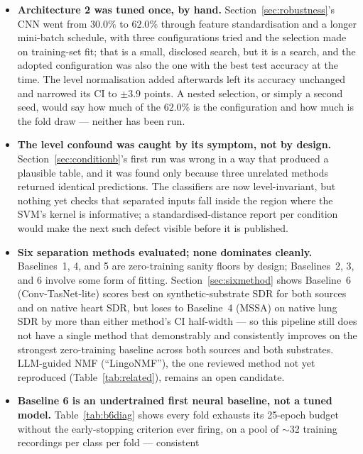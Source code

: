 \documentclass[11pt]{article}
\begin{document}
\begin{itemize}
    synthetic substrate's job (Section~\ref{sec:synthetic}); running the
    sweep and both classifiers over its 1500 rows is the direct next step.
  \item \textbf{Architecture 2 was tuned once, by hand.}
    Section~\ref{sec:robustness}'s CNN went from $30.0\%$ to $62.0\%$
    through feature standardisation and a longer mini-batch schedule, with
    three configurations tried and the selection made on training-set fit;
    that is a small, disclosed search, but it is a search, and the adopted
    configuration was also the one with the best test accuracy at the
    time. The level normalisation added afterwards left its accuracy
    unchanged and narrowed its CI to $\pm3.9$ points. A nested selection,
    or simply a second seed, would say how much of the $62.0\%$ is the
    configuration and how much is the fold draw --- neither has been run.
  \item \textbf{The level confound was caught by its symptom, not by
    design.} Section~\ref{sec:conditionb}'s first run was wrong in a way
    that produced a plausible table, and it was found only because three
    unrelated methods returned identical predictions. The classifiers are
    now level-invariant, but nothing yet checks that separated inputs
    fall inside the region where the SVM's kernel is informative; a
    standardised-distance report per condition would make the next such
    defect visible before it is published.
  \item \textbf{Six separation methods evaluated; none dominates cleanly.}
    Baselines~1, 4, and 5 are zero-training sanity floors by design;
    Baselines~2, 3, and 6 involve some form of fitting. Section~\ref{sec:sixmethod}
    shows Baseline~6 (Conv-TasNet-lite) scores best on synthetic-substrate
    SDR for both sources and on native heart SDR, but loses to Baseline~4
    (MSSA) on native lung SDR by more than either method's CI half-width ---
    so this pipeline still does not have a single method that demonstrably
    and consistently improves on the strongest zero-training baseline across
    both sources and both substrates. LLM-guided NMF (``LingoNMF''), the one
    reviewed method not yet reproduced (Table~\ref{tab:related}), remains an
    open candidate.
  \item \textbf{Baseline 6 is an undertrained first neural baseline, not a
    tuned model.} Table~\ref{tab:b6diag} shows every fold exhausts its
    25-epoch budget without the early-stopping criterion ever firing, on a
    pool of $\sim$32 training recordings per class per fold --- consistent

\end{itemize}
\end{document}
